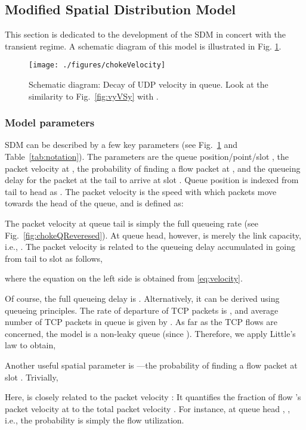 \documentclass{IEEEtran}
\begin{document}
    \subsection{Modified Spatial Distribution Model}\label{subsec:modifiedSDM}
    This section is dedicated to the development of the SDM in concert with the transient regime. A schematic diagram of this model is illustrated in Fig. \ref{fig:udpVelocityDecay}.

    \begin{figure}[h!]
            \centering
            \texttt{[image: ./figures/chokeVelocity]}\caption{Schematic diagram: Decay of UDP velocity  in queue. Look at the similarity to Fig.~\ref{fig:vyVSy} with .}
            \label{fig:udpVelocityDecay}
    \end{figure}

    \subsubsection{Model parameters}
SDM can be described by a few key parameters (see Fig.~\ref{fig:udpVelocityDecay} and Table~\ref{tab:notation}). The parameters are the queue position/point/slot , the packet velocity  at , the probability  of finding a flow  packet at , and the queueing delay  for the packet at the tail to arrive at slot . Queue position  is indexed from tail to head as . The packet velocity  is the speed with which packets move towards the head of the queue, and is defined as:
    

    The packet velocity at queue tail  is simply the full queueing rate  (see Fig.~\ref{fig:chokeQReveresed}). At queue head, however,  is merely the link capacity, i.e., . The packet velocity  is related to the queueing delay  accumulated in going from tail  to slot  as follows,
        
where the equation on the left side is obtained from \eqref{eq:velocity}.

    Of course, the full queueing delay is .  Alternatively, it can be derived using queueing principles.  The rate of departure of TCP packets is , and average number of TCP packets in queue is given by . As far as the TCP flows are concerned, the model is a non-leaky queue (since ). Therefore, we apply Little's law to obtain,
    

    Another useful spatial parameter is ---the probability of finding a flow  packet at slot . Trivially,
    

    Here,  is closely related to the packet velocity : It quantifies the fraction of flow 's packet velocity at  to the total packet velocity . For instance, at queue head , , i.e., the probability is simply the flow utilization.
\end{document}
